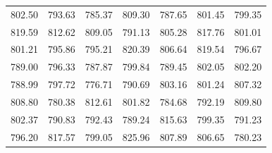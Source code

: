 \begin{description}[noitemsep]
\begin{description}[noitemsep]
\begin{table}
\begin{center}
\begin{xtabular}[t]{|l|l|l|l|l|l|l|}
        802.50 &
        793.63 &
        785.37 &
        809.30 &
        787.65 &
        801.45 &
        799.35%
     \tabularnewline{}
        819.59 &
        812.62 &
        809.05 &
        791.13 &
        805.28 &
        817.76 &
        801.01%
     \tabularnewline{}
        801.21 &
        795.86 &
        795.21 &
        820.39 &
        806.64 &
        819.54 &
        796.67%
     \tabularnewline{}
        789.00 &
        796.33 &
        787.87 &
        799.84 &
        789.45 &
        802.05 &
        802.20%
     \tabularnewline{}
        788.99 &
        797.72 &
        776.71 &
        790.69 &
        803.16 &
        801.24 &
        807.32%
     \tabularnewline{}
        808.80 &
        780.38 &
        812.61 &
        801.82 &
        784.68 &
        792.19 &
        809.80%
     \tabularnewline{}
        802.37 &
        790.83 &
        792.43 &
        789.24 &
        815.63 &
        799.35 &
        791.23%
     \tabularnewline{}
        796.20 &
        817.57 &
        799.05 &
        825.96 &
        807.89 &
        806.65 &
        780.23%
     \tabularnewline{}

\end{xtabular}
\end{center}
\end{table}
\end{description}
\end{description}
